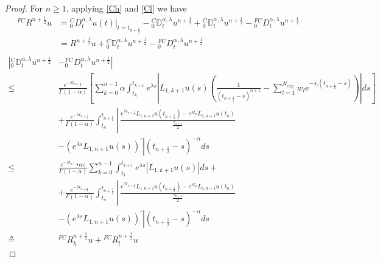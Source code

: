 \documentclass[10pt, reqno]{amsart}
\theoremstyle{remark}
\theoremstyle{definition}
\numberwithin{table}{section}
\begin{document}
\begin{proof}
    For $n\geq1$, applying \ref{Ch} and \ref{Cl} we have
    \begin{equation}
    \begin{aligned}
        {}^{FC}R^{n+\frac{1}{2}}u&={}^C_0D^{\alpha, \lambda}_tu(t)|_{t=t_{n+\frac{1}{2}}}- {}^C_0\mathbb{D}_t^{\alpha,  \lambda} u^{n+\frac{1}{2}}+{}^C_0\mathbb{D}_t^{\alpha,  \lambda} u^{n+\frac{1}{2}}-{ }_0^{FC}D_t^{\alpha,  \lambda} u^{n+\frac{1}{2}}\\
        &=R^{n+\frac{1}{2}}u+{}^C_0\mathbb{D}_t^{\alpha,  \lambda} u^{n+\frac{1}{2}}-{ }_0^{FC}D_t^{\alpha,  \lambda} u^{n+\frac{1}{2}}\\
    \end{aligned}
\end{equation}
\begin{align*}
    \left|{}^C_0\mathbb{D}_t^{\alpha,  \lambda} u^{n+\frac{1}{2}}\right. &\left. - { }_0^{FC}D_t^{\alpha,  \lambda}u^{n+\frac{1}{2}}\right|\\
    \leq& \frac{e^{-\lambda t_{n+\frac{1}{2}}}}{\Gamma(1-\alpha)}\left[\sum_{k=0}^{n-1}\alpha\int_{t_k}^{t_{k+1}}e^{\lambda s}\left|L_{1, {k+1}}u(s)(\frac{1}{\left(t_{n+\frac{1}{2}}-s\right)^{\alpha+1}}-\sum_{l=1}^{N_{exp}}w_le^{-s_l(t_{n+\frac{1}{2}}-s)})\right|ds\right]\\
         &+\frac{e^{-\lambda t_{n+\frac{1}{2}}}}{\Gamma(1-\alpha)} \int_{t_{n}}^{t_{n+\frac{1}{2}}} \left\lvert\,  \frac{e^{\lambda t_{n+\frac{1}{2}}} L_{1,  n+1} u\left(t_{n+\frac{1}{2}}\right)-e^{\lambda t_n} L_{1,  n+1} u\left(t_n\right)}{\frac{\tau_{n+1}}{2}}\right.  \\
& \left. -\left(e^{\lambda s} L_{1,  n+1} u(s)\right)^{\prime}\right| \left(t_{n+\frac{1}{2}}-s\right)^{-\alpha} d s\\
\leq &\frac{e^{-\lambda t_{n+\frac{1}{2}}} \alpha \varepsilon}{\Gamma(1-\alpha)} \sum_{k=0}^{n-1} \int_{t_{k}}^{t_{k+1}} e^{\lambda s}\left|L_{1,  k+1} u(s)\right| d s+\\
&+\frac{e^{-\lambda t_{n+\frac{1}{2}}}}{\Gamma(1-\alpha)} \int_{t_{n}}^{t_{n+\frac{1}{2}}} \left\lvert\,  \frac{e^{\lambda t_{n+\frac{1}{2}}} L_{1,  n+1} u\left(t_{n+\frac{1}{2}}\right)-e^{\lambda t_n} L_{1,  n+1} u\left(t_n\right)}{\frac{\tau_{n+1}}{2}}\right.  \\
& \left. -\left(e^{\lambda s} L_{1,  n+1} u(s)\right)^{\prime}\right| \left(t_{n+\frac{1}{2}}-s\right)^{-\alpha} d s\\
\triangleq{}& {}^{FC}R^{n+\frac{1}{2}}_hu+ {}^{FC}R^{n+\frac{1}{2}}_lu
\end{align*}

\end{proof}
\end{document}
